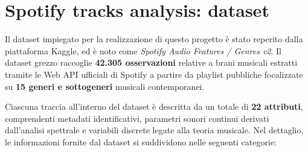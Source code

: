 \section{Spotify tracks analysis: dataset}

Il dataset impiegato per la realizzazione di questo progetto è stato reperito dalla piattaforma Kaggle, ed è noto come \textit{Spotify Audio Features / Genres v2}. Il dataset grezzo raccoglie \textbf{42.305 osservazioni} relative a brani musicali estratti tramite le Web API ufficiali di Spotify a partire da playlist pubbliche focalizzate su \textbf{15 generi e sottogeneri} musicali contemporanei. 

Ciascuna traccia all'interno del dataset è descritta da un totale di \textbf{22 attributi}, comprendenti metadati identificativi, parametri sonori continui derivati dall'analisi spettrale e variabili discrete legate alla teoria musicale. Nel dettaglio, le informazioni fornite dal dataset si suddividono nelle seguenti categorie:

